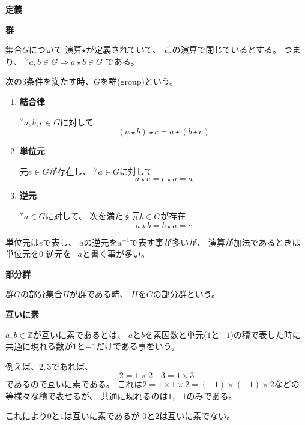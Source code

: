 \documentclass[12pt,b5paper]{ltjsarticle}
\begin{document}
\hrulefill
\textbf{定義}
\hrulefill

\textbf{群}

集合$G$について
演算$\star$が定義されていて、
この演算で閉じているとする。
つまり、
${}^{\forall}a,b\in G \Rightarrow a\star b\in G$
である。

次の3条件を満たす時、$G$を群(group)という。
\begin{enumerate}
 \item \textbf{結合律}

       ${}^{\forall}a,b,c\in G$に対して
       \begin{equation}
        (a\star b) \star c = a\star (b \star c)
       \end{equation}

 \item \textbf{単位元}

       元$e\in G$が存在し、
       ${}^{\forall}a\in G$に対して
       \begin{equation}
        a\star e = e \star a = a
       \end{equation}

 \item \textbf{逆元}

       ${}^{\forall}a\in G$に対して、
       次を満たす元$b\in G$が存在
       \begin{equation}
        a\star b = b \star a = e
       \end{equation}
\end{enumerate}

単位元は$e$で表し、
$a$の逆元を$a^{-1}$で表す事が多いが、
演算が加法であるときは単位元を$0$
逆元を$-a$と書く事が多い。

\textbf{部分群}

群$G$の部分集合$H$が群である時、
$H$を$G$の部分群という。


\textbf{互いに素}


$a,b\in\mathbb{Z}$が互いに素であるとは、
$a$と$b$を素因数と単元($1$と$-1$)の積で表した時に
共通に現れる数が$1$と$-1$だけである事をいう。

例えば、$2,3$であれば、
\begin{equation}
 2 = 1\times 2
  \quad
 3 = 1\times 3
\end{equation}
であるので互いに素である。
これは$2=1\times 1\times 2 = (-1)\times (-1) \times 2$などの
等様々な積で表せるが、
共通に現れるのは$1,-1$のみである。

これにより$0$と$1$は互いに素であるが
$0$と$2$は互いに素でない。
\end{document}
